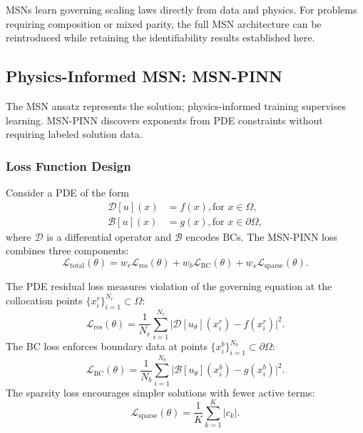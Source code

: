 \documentclass{article}
\theoremstyle{plain}
\theoremstyle{definition}
\theoremstyle{remark}
\newcommand{\mcL}{\mathcal{L}}
\newcommand{\mcD}{\mathcal{D}}
\newcommand{\mcB}{\mathcal{B}}
\begin{document}
MSNs learn governing scaling laws directly from data and physics. For problems requiring composition or mixed parity, the full MSN architecture can be reintroduced while retaining the identifiability results established here.

\subsection{Physics-Informed MSN: MSN-PINN}

The MSN ansatz represents the solution; physics-informed training supervises learning. MSN-PINN discovers exponents from PDE constraints without requiring labeled solution data.

\subsubsection{Loss Function Design}

Consider a PDE of the form
\begin{equation}
	\label{eq:pde}
	\begin{aligned}
		\mcD[u](x) & = f(x), \text{for } x \in \Omega,         \\
		\mcB[u](x) & = g(x), \text{for } x \in \partial\Omega,
	\end{aligned}
\end{equation}
where $\mcD$ is a differential operator and $\mcB$ encodes BCs. The MSN-PINN loss combines three components:
\begin{equation}
	\label{eq:pinn_loss}
	\mcL_{\text{total}}(\theta) = w_r \mcL_{\text{res}}(\theta) + w_b \mcL_{\text{BC}}(\theta) + w_s \mcL_{\text{sparse}}(\theta).
\end{equation}

The PDE residual loss measures violation of the governing equation at the collocation points $\{x_i^r\}_{i=1}^{N_r} \subset \Omega$:
\begin{equation}
	\mcL_{\text{res}}(\theta) = \frac{1}{N_r} \sum_{i=1}^{N_r} \lvert \mcD[u_\theta](x_i^r) - f(x_i^r) \rvert^2.
\end{equation}
The BC loss enforces boundary data at points $\{x_i^b\}_{i=1}^{N_b} \subset \partial\Omega$:
\begin{equation}
	\mcL_{\text{BC}}(\theta) = \frac{1}{N_b} \sum_{i=1}^{N_b} \lvert \mcB[u_\theta](x_i^b) - g(x_i^b) \rvert^2.
\end{equation}
The sparsity loss encourages simpler solutions with fewer active terms:
\begin{equation}
	\mcL_{\text{sparse}}(\theta) = \frac{1}{K} \sum_{k=1}^{K} |c_k|.
\end{equation}
\end{document}
